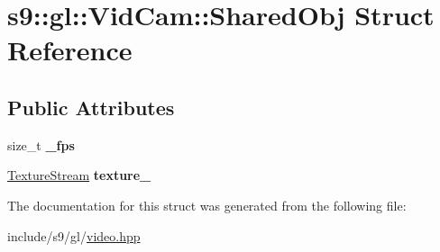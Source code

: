 \hypertarget{structs9_1_1gl_1_1VidCam_1_1SharedObj}{\section{s9\-:\-:gl\-:\-:\-Vid\-Cam\-:\-:\-Shared\-Obj \-Struct \-Reference}
\label{structs9_1_1gl_1_1VidCam_1_1SharedObj}
}
\subsection*{\-Public \-Attributes}
\begin{DoxyCompactItemize}
\item 
\hypertarget{structs9_1_1gl_1_1VidCam_1_1SharedObj_ac6d532dba32b39027e2d1814daebbb1d}{size\-\_\-t {\bfseries \-\_\-fps}}\label{structs9_1_1gl_1_1VidCam_1_1SharedObj_ac6d532dba32b39027e2d1814daebbb1d}

\item 
\hypertarget{structs9_1_1gl_1_1VidCam_1_1SharedObj_a71d73e2f8a19a8f7dafb9736dce79cbd}{\hyperlink{classs9_1_1gl_1_1TextureStream}{\-Texture\-Stream} {\bfseries texture\-\_\-}}\label{structs9_1_1gl_1_1VidCam_1_1SharedObj_a71d73e2f8a19a8f7dafb9736dce79cbd}

\end{DoxyCompactItemize}


\-The documentation for this struct was generated from the following file\-:\begin{DoxyCompactItemize}
\item 
include/s9/gl/\hyperlink{video_8hpp}{video.\-hpp}\end{DoxyCompactItemize}
